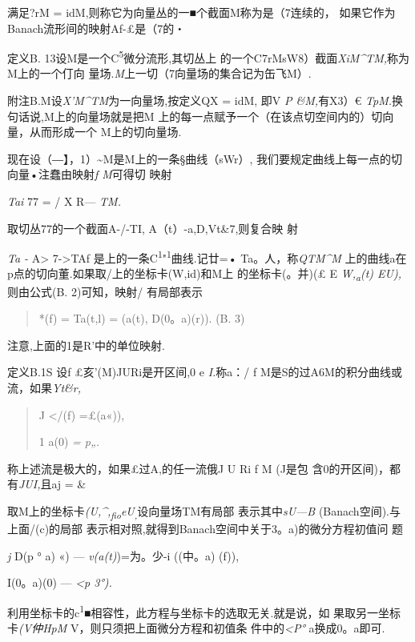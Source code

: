 满足?rM = idM,则称它为向量丛的一■个截面M称为是（7连续的，
如果它作为Banach流形间的映射Af-£是（7的・

定义B. 13设M是一个C\textsuperscript{5}微分流形,其切丛上
的一个C7rMsW8）截面\emph{XiM\^{}TM,}称为M上的一个仃向
量场.\emph{M}上一切（7向量场的集合记为缶飞M）.

附注B.M设\emph{X'M\^{}TM}为一向量场,按定义QX = idM, 即V \emph{P
\&M,}有X3）€ \emph{TpM.}换句话说,M上的向量场就是把M
上的每一点赋予一个（在该点切空间内的）切向量，从而形成一个
M上的切向量场.

现在设（―】，1）\textasciitilde{}M是M上的一条§曲线（sWr）,
我们要规定曲线上每一点的切向量•注蠢由映射\emph{f M}可得切 映射

\emph{Tai} 77 = / X R--- \emph{TM.}

取切丛77的一个截面A-/-TI, A（t）-a,D,Vt\&7,则复合映 射

\emph{Ta -} A\textgreater{} 7-\textgreater{}TAf
是上的一条C\textsuperscript{1}"\textsuperscript{1}曲线.记廿=•
Ta。人，称\emph{QTM\^{}M}
上的曲线a在p点的切向董.如果取/上的坐标卡(W,id)和M上 的坐标卡(。并)(£ E
\emph{W,\textsubscript{a}(t) EU),}则由公式(B. 2)可知，映射/ 有局部表示

\begin{quote}
*(f) = Ta(t,l) = (a(t), D(0。a)(r)). (B. 3)
\end{quote}

注意,上面的1是R'中的单位映射.

定义B.1S 设f £亥'(M)JURi是开区间,0 e \emph{I.}称a：/ f
M是S的过A6M的积分曲线或流，如果\emph{Yt\&r,}

\begin{quote}
J \textless{}/(f) =£(a«)),

1 a(0) \emph{= p„.}
\end{quote}

称上述流是极大的，如果£过A,的任一流俄J U Ri f M (J是包
含0的开区间)，都有\emph{JUI,}且a\textbar{}j = \&

取M上的坐标卡\emph{(U,\^{},\textsubscript{fio}eU\textsubscript{,}}设向量场TM有局部
表示其中\emph{sU---B} (Banach空间).与上面/(c)的局部
表示相对照,就得到Banach空间中关于3。a)的微分方程初值问 题

\emph{j} D(p ° a) «) --- \emph{v(a(t)})=为。少-i ((中。a) (f)),

I(0。a)(0) --- \emph{\textless{}p 3°).}

利用坐标卡的c\textsuperscript{1}■相容性，此方程与坐标卡的选取无关.就是说，如
果取另一坐标卡\emph{(V仲HpM} V，则只须把上面微分方程和初值条
件中的\emph{\textless{}P°} a换成0。a即可.

